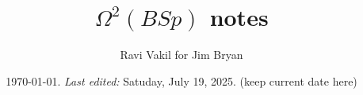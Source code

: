 \newcommand{\aff}{\rm{aff}}

\newcommand{\Gr}{\rm{Gr}}
\newcommand{\LGr}{\rm{LGr}}
\newcommand{\SAG}{\rm{SpAfGr}}
\newcommand{\LSG}{\rm{LgStGr}}

\newcommand{\jalpha}{\mathord{j\mkern-7mu\alpha}}
\newcommand{\vjalpha}{\vec{\jalpha}}

\newcommand{\Id}{\rm{Id}}



\newcommand{\remind}[1]{{\bf[{\large TODO:  } #1]}}
\newcommand{\lremind}[1]{{\bf[label:  #1]}}
\newcommand{\notation}[1]{}
\renewcommand{\lremind}[1]{{}}

\newcommand{\ravi}[1]{{\bf [#1 --- Ravi]}}
\newcommand{\hidden}[1]{\footnote{Hidden:  #1}}

\newcommand{\cut}[1]{}


\newcommand{\leftbox}[1]{      \begin{flushleft}\fbox{ \parbox{25em}{
#1        }}\end{flushleft}
}\newcommand{\centerbox}[1]{      \begin{center}\fbox{ \parbox{25em}{
#1        }}\end{center}
}
\newcommand{\rightbox}[1]{      \begin{flushright}\fbox{ \parbox{25em}{
#1        }}\end{flushright}
}



\pagestyle{plain}
\title{\Large{$\Omega^2(BSp)$ notes}}
\author{Ravi Vakil for Jim Bryan}
\date{\today .   {\em Last edited:}
 Satuday, July 19, 2025. (keep current date here)  }
\maketitle
\tableofcontents


